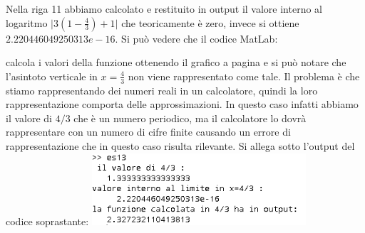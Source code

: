 \begin{flushleft}
Nella riga 11 abbiamo calcolato e restituito in output il valore interno al logaritmo $\big|3(1-\frac{4}{3})+1\big|$ che teoricamente è zero, invece si ottiene $2.220446049250313e-16 $. 
Si può vedere che il codice MatLab:

calcola i valori della funzione ottenendo il grafico a pagina \pageref{fes113} e si può notare che l'asintoto verticale in $x=\frac{4}{3}$ non viene rappresentato come tale. Il problema è che stiamo rappresentando dei numeri reali in un calcolatore, quindi la loro rappresentazione comporta delle approssimazioni. In questo caso infatti abbiamo il valore di $4/3$ che è un numero periodico, ma il calcolatore lo dovrà rappresentare con un numero di cifre finite causando un errore di rappresentazione che in questo caso risulta rilevante. Si allega sotto l'output del codice soprastante:
\includegraphics[width=300px]{cap_1/es13/es113.png}
\end{flushleft}